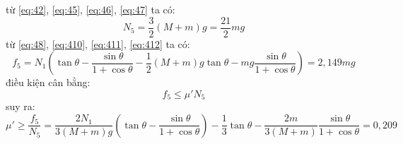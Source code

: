 từ \eqref{eq:42}, \eqref{eq:45}, \eqref{eq:46}, \eqref{eq:47} ta có:
\begin{equation}
  \label{eq:419}
  N_{5}=\frac{3}{2}(M+m)g=\frac{21}{2}mg
\end{equation}
từ \eqref{eq:48}, \eqref{eq:410}, \eqref{eq:411}, \eqref{eq:412} ta có:
\begin{equation}
  \label{eq:420}
  f_{5}=N_{1}\left(\tan\theta-\frac{\sin\theta}{1+\cos\theta}-\frac{1}{2}(M+m)g\tan\theta-mg\frac{\sin\theta}{1+\cos\theta}\right)=2,149mg
\end{equation}
điều kiện cân bằng:
\begin{equation}
  f_{5}\leqslant\mu' N_{5}
\end{equation}
suy ra:
\begin{equation}
  \label{eq:422}
  \mu'\geqslant\frac{f_{5}}{N_{5}}=\frac{2N_{1}}{3(M+m)g}\left(\tan\theta-\frac{\sin\theta}{1+\cos\theta}\right)-\frac{1}{3}\tan\theta-\frac{2m}{3(M+m)}\frac{\sin\theta}{1+\cos\theta}=0,209
\end{equation}
